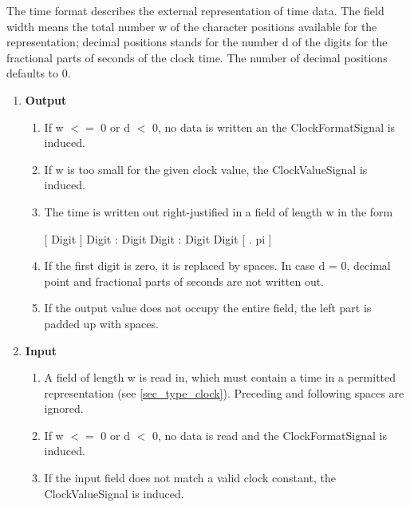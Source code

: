 The time format describes the external representation of time data. The
field width means the total number w of the character positions
available for the representation; decimal positions stands for the
number d of the digits for the fractional parts of seconds of the clock
time. 
The number of decimal positions defaults to 0.
\begin{enumerate}
\item {\bf Output}\\
\begin{enumerate}

\item If w $<=$ 0 or d $<$ 0, no data is written an the ClockFormatSignal
   is induced.

\item If w is too small for the given clock value, the ClockValueSignal
   is induced.

\item The time is written out right-justified in a field of length w in the
form

[ Digit ] Digit : Digit Digit : Digit Digit [ . pi ]

\item If the first digit is zero, it is replaced by spaces. In case d = 0,
decimal point and fractional parts of seconds are not written out.

\item If the output value does not occupy the entire field, the left part is
padded up with spaces.
\end{enumerate}

\item {\bf Input}\\
\begin{enumerate}
\item A field of length w is read in, which must contain a time in a permitted
representation (see \ref{sec_type_clock}). Preceding and following spaces are ignored.

\item If w $<=$ 0 or d $<$ 0, no data is read and the ClockFormatSignal
   is induced.

\item If the input field does not match a valid clock constant, the 
   ClockValueSignal is induced.



\end{enumerate}
\end{enumerate}
